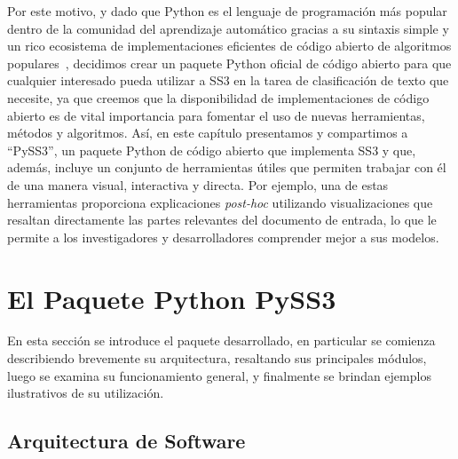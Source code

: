 Por este motivo, y dado que Python es el lenguaje de programación más popular dentro de la comunidad del aprendizaje automático gracias a su sintaxis simple y un rico ecosistema de implementaciones eficientes de código abierto de algoritmos populares~\cite{python2007}, decidimos crear un paquete Python oficial de código abierto para que cualquier interesado pueda utilizar a SS3 en la tarea de clasificación de texto que necesite, ya que creemos que la disponibilidad de implementaciones de código abierto es de vital importancia para fomentar el uso de nuevas herramientas, métodos y algoritmos.
Así, en este capítulo presentamos y compartimos a ``PySS3'', un paquete Python de código abierto que implementa SS3 y que, además, incluye un conjunto de herramientas útiles que permiten trabajar con él de una manera visual, interactiva y directa. Por ejemplo, una de estas herramientas proporciona explicaciones \emph{post-hoc} utilizando visualizaciones que resaltan directamente las partes relevantes del documento de entrada, lo que le permite a los investigadores y desarrolladores comprender mejor a sus modelos.


\section{El Paquete Python PySS3}\label{sec:pyss3}

En esta sección se introduce el paquete desarrollado, en particular se comienza describiendo brevemente su arquitectura, resaltando sus principales módulos, luego se examina su funcionamiento general, y finalmente se brindan ejemplos ilustrativos de su utilización.

\subsection{Arquitectura de Software}

